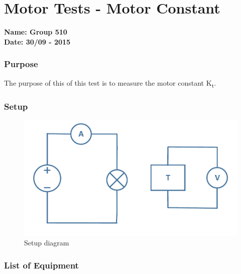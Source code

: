 \pagebreak
\section{Motor Tests - Motor Constant} \label{app:motorTestMotorConstant}
\textbf{Name: Group 510}\\
\textbf{Date: 30/09 - 2015}

\subsubsection{Purpose}
The purpose of this of this test is to measure the motor constant \si{K_t}.

\subsubsection{Setup}
\begin{figure}[H]
  \centering
	\includegraphics[scale=0.5]{figures/MotorTest5.pdf}
	\caption{Setup diagram}
\end{figure}\vspace{-5mm}

\subsubsection{List of Equipment}

